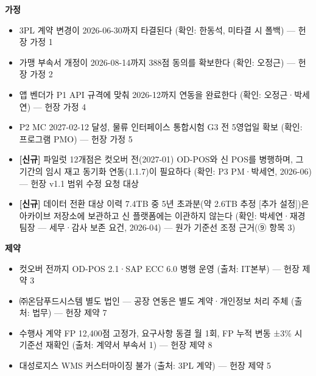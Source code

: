 \documentclass[10pt,a4paper]{article}
\begin{document}
\begin{fieldbox}
\textbf{가정} 
\ifwbblank{}\else
\begin{itemize}
\item 3PL 계약 변경이 2026-06-30까지 타결된다 (확인: 한동석, 미타결 시 폴백) — 헌장 가정 1
\item 가맹 부속서 개정이 2026-08-14까지 388점 동의를 확보한다 (확인: 오정근) — 헌장 가정 2
\item 앱 벤더가 P1 API 규격에 맞춰 2026-12까지 연동을 완료한다 (확인: 오정근·박세연) — 헌장 가정 4
\item P2 MC 2027-02-12 달성, 물류 인터페이스 통합시험 G3 전 5영업일 확보 (확인: 프로그램 PMO) — 헌장 가정 5
\item \textbf{[신규]} 파일럿 12개점은 컷오버 전(2027-01) OD-POS와 신 POS를 병행하며, 그 기간의 임시 재고 동기화 연동(1.1.7)이 필요하다 (확인: P3 PM·박세연, 2026-06) — 헌장 v1.1 범위 수정 요청 대상
\item \textbf{[신규]} 데이터 전환 대상 이력 7.4TB 중 5년 초과분(약 2.6TB 추정 [추가 설정])은 아카이브 저장소에 보관하고 신 플랫폼에는 이관하지 않는다 (확인: 박세연·재경팀장 — 세무·감사 보존 요건, 2026-04) — 원가 기준선 조정 근거(⑨ 항목 3)
\end{itemize}\fi
\end{fieldbox}
\begin{fieldbox}
\textbf{제약} 
\ifwbblank{}\else
\begin{itemize}
\item 컷오버 전까지 OD-POS 2.1·SAP ECC 6.0 병행 운영 (출처: IT본부) — 헌장 제약 3
\item ㈜온담푸드시스템 별도 법인 — 공장 연동은 별도 계약·개인정보 처리 주체 (출처: 법무) — 헌장 제약 7
\item 수행사 계약 FP 12,400점 고정가, 요구사항 동결 월 1회, FP 누적 변동 ±3\% 시 기준선 재확인 (출처: 계약서 부속서 1) — 헌장 제약 8
\item 대성로지스 WMS 커스터마이징 불가 (출처: 3PL 계약) — 헌장 제약 5
\end{itemize}\fi
\end{fieldbox}
\end{document}
